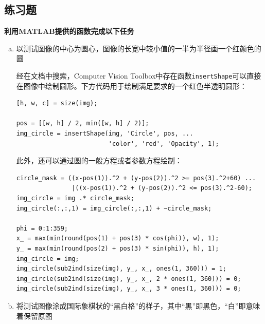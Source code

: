 \documentclass[10pt, a4paper]{article}
\begin{document}
\subsection{练习题}
\textbf{利用MATLAB提供的函数完成以下任务}
\begin{enumerate}[(a)]
    \item 以测试图像的中心为圆心，图像的长宽中较小值的一半为半径画一个红颜色的圆

          经在文档中搜索，Computer Vision Toolbox中存在函数\texttt{insertShape}可以直接在图像中绘制圆形。下方代码用于绘制满足要求的一个红色半透明圆形：

          \begin{verbatim}
[h, w, c] = size(img);

pos = [[w, h] / 2, min([w, h] / 2)];
img_circle = insertShape(img, 'Circle', pos, ...
                         'color', 'red', 'Opacity', 1);
          \end{verbatim}

          此外，还可以通过圆的一般方程或者参数方程绘制：

          \begin{verbatim}
circle_mask = ((x-pos(1)).^2 + (y-pos(2)).^2 >= pos(3).^2+60) ...
               |((x-pos(1)).^2 + (y-pos(2)).^2 <= pos(3).^2-60);
img_circle = img .* circle_mask;
img_circle(:,:,1) = img_circle(:,:,1) + ~circle_mask;

phi = 0:1:359;
x_ = max(min(round(pos(1) + pos(3) * cos(phi)), w), 1);
y_ = max(min(round(pos(2) + pos(3) * sin(phi)), h), 1);
img_circle = img;
img_circle(sub2ind(size(img), y_, x_, ones(1, 360))) = 1;
img_circle(sub2ind(size(img), y_, x_, 2 * ones(1, 360))) = 0;
img_circle(sub2ind(size(img), y_, x_, 3 * ones(1, 360))) = 0;
          \end{verbatim}

    \item 将测试图像涂成国际象棋状的“黑白格”的样子，其中“黑”即黑色，“白”即意味着保留原图


\end{enumerate}
\end{document}
